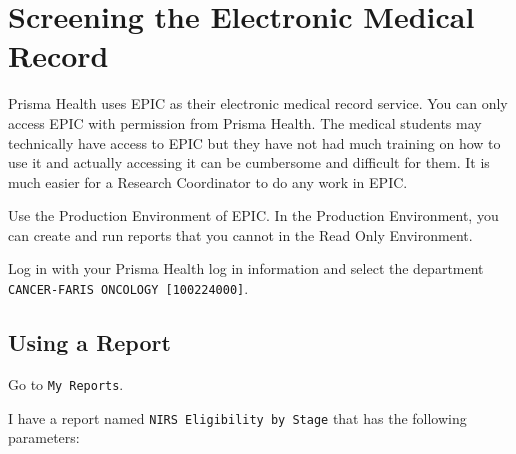 \documentclass[
]{book}
\begin{document}
\hypertarget{screening-the-electronic-medical-record}{%
\section{Screening the Electronic Medical Record}\label{screening-the-electronic-medical-record}}

Prisma Health uses EPIC as their electronic medical record service.
You can only access EPIC with permission from Prisma Health. The medical students may technically have access to EPIC but they have not had much training on how to use it and actually accessing it can be cumbersome and difficult for them. It is much easier for a Research Coordinator to do any work in EPIC.

Use the Production Environment of EPIC. In the Production Environment, you can create and run reports that you cannot in the Read Only Environment.

Log in with your Prisma Health log in information and select the department \texttt{CANCER-FARIS\ ONCOLOGY\ {[}100224000{]}}.

\hypertarget{using-a-report}{%
\subsection{Using a Report}\label{using-a-report}}

Go to \texttt{My\ Reports}.

I have a report named \texttt{NIRS\ Eligibility\ by\ Stage} that has the following parameters:
\end{document}
